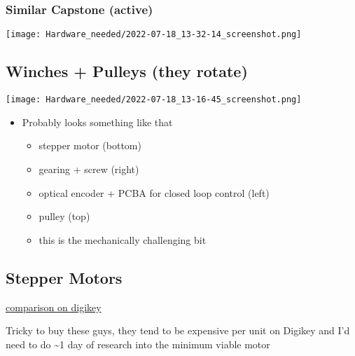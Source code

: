 \documentclass[11pt]{article}
\begin{document}
\subsubsection{Similar Capstone (active)}
\label{sec:orgad3693d}
\begin{center}
\texttt{[image: Hardware\_needed/2022-07-18\_13-32-14\_screenshot.png]}
\end{center}

\subsection{Winches + Pulleys (they rotate)}
\label{sec:orga222b77}

\begin{center}
\texttt{[image: Hardware\_needed/2022-07-18\_13-16-45\_screenshot.png]}
\end{center}

\begin{itemize}
\item Probably looks something like that
\begin{itemize}
\item stepper motor (bottom)
\item gearing + screw (right)
\item optical encoder + PCBA for closed loop control (left)
\item pulley (top)
\item this is the mechanically challenging bit
\end{itemize}
\end{itemize}

\subsection{Stepper Motors}
\label{sec:orgf34c45d}

\href{https://www.digikey.com/en/products/compare?s=N4IgzCBcDaIEwBYCMB2ADHArCANCBAHAmAlriJgJyWZoqXkBsmBBmKKIAunglCAHoApgDsBABwBOAewAmAVwDGAFwDOAgGYBLADbKhkgav3jxBgLQBbacumT1qSgH5VAXgByCAJIBzAFYAwgBCitIAogAeSNIAIgDiAKpBlkExAILuPgBaAO4A0gCaQdIAikEoeWkARgBKQT4AEgVFlmFplmkAaj5pWQCGAWkA8gCyGX7iAdLiBNKKJWkAGiVeaQ1pAZglC1klANZpImkAUgVpKMMFPQBuPgAqaUFD7n6lABZ7e7LuIhEAYgBlLzHLR5NA9ZQxMIABTify6YGhfy8WSCflk11k0i8NQWdz6d1UOWOPjeETyCR8JQaPgOdwAXmFFASSqosmk0O5ViAAL5AA}{comparison on digikey}

Tricky to buy these guys, they tend to be expensive per unit on Digikey and I'd need to do \textasciitilde{}1 day of research into the minimum viable motor
\end{document}
